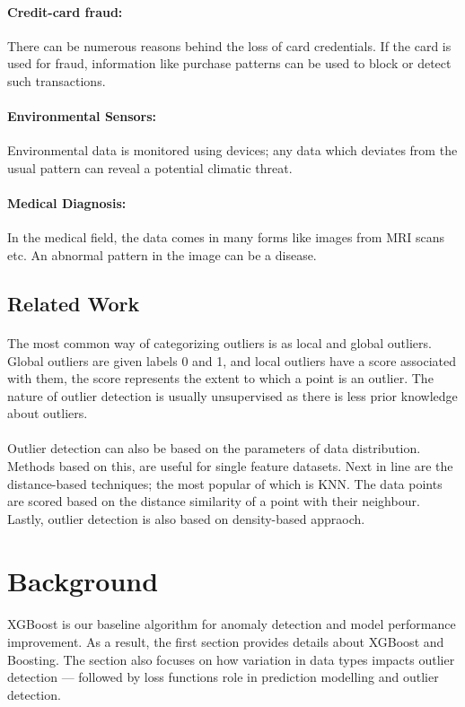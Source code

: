 \documentclass[runningheads]{llncs}
\begin{document}
\paragraph{Credit-card fraud:} There can be numerous reasons behind the loss of card credentials. If the card is used for fraud, information like purchase patterns can be used to block or detect such transactions.
\paragraph{Environmental Sensors:} Environmental data is monitored using devices; any data which deviates from the usual pattern can reveal a potential climatic threat.
\paragraph{Medical Diagnosis:} In the medical field, the data comes in many forms like images from MRI scans etc. An abnormal pattern in the image can be a disease.

\subsection{Related Work}
\paragraph{} The most common way of categorizing outliers is as local and global outliers. Global outliers are given labels 0 and 1, and local outliers have a score associated with them, the score represents the extent to which a point is an outlier. The nature of outlier detection is usually unsupervised as there is less prior knowledge about outliers.

\paragraph{} Outlier detection can also be based on the parameters of data distribution. Methods based on this, are useful for single feature datasets. Next in line are the distance-based techniques; the most popular of which is KNN. The data points are scored based on the distance similarity of a point with their neighbour. Lastly, outlier detection is also based on density-based appraoch. 


\section{Background}
\paragraph{} XGBoost is our baseline algorithm for anomaly detection and model performance improvement. As a result, the first section provides details about XGBoost and Boosting. The section also focuses on how variation in data types impacts outlier detection — followed by loss functions role in prediction modelling and outlier detection.
\end{document}

